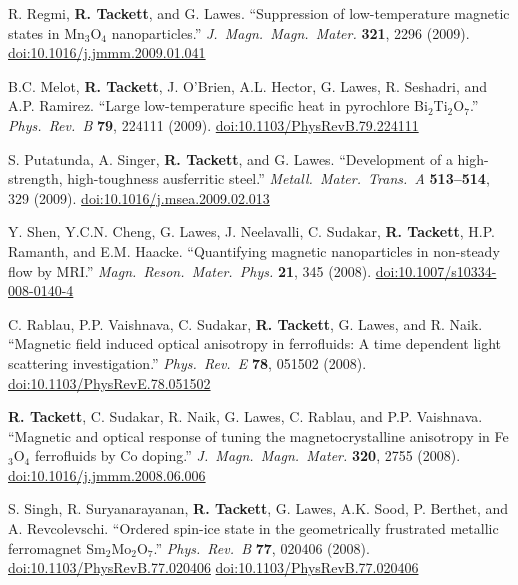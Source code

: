 \documentclass[10pt]{article}
\begin{document}
\begin{reflist}
\item R. Regmi, \textbf{R. Tackett}, and G. Lawes. ``Suppression of low-temperature magnetic states in Mn$_3$O$_4$ nanoparticles.'' \textit{J.\ Magn.\ Magn.\ Mater.} \textbf{321}, 2296 (2009). \href{https://doi.org/10.1016/j.jmmm.2009.01.041}{\small\allowbreak doi:10.1016/j.jmmm.2009.01.041}
\item B.C. Melot, \textbf{R. Tackett}, J. O'Brien, A.L. Hector, G. Lawes, R. Seshadri, and A.P. Ramirez. ``Large low-temperature specific heat in pyrochlore Bi$_2$Ti$_2$O$_7$.'' \textit{Phys.\ Rev.\ B} \textbf{79}, 224111 (2009). \href{https://doi.org/10.1103/PhysRevB.79.224111}{\small\allowbreak doi:10.1103/PhysRevB.79.224111}
\item S. Putatunda, A. Singer, \textbf{R. Tackett}, and G. Lawes. ``Development of a high-strength, high-toughness ausferritic steel.'' \textit{Metall.\ Mater.\ Trans.\ A} \textbf{513--514}, 329 (2009). \href{https://doi.org/10.1016/j.msea.2009.02.013}{\small\allowbreak doi:10.1016/j.msea.2009.02.013}
\item Y. Shen, Y.C.N. Cheng, G. Lawes, J. Neelavalli, C. Sudakar, \textbf{R. Tackett}, H.P. Ramanth, and E.M. Haacke. ``Quantifying magnetic nanoparticles in non-steady flow by MRI.'' \textit{Magn.\ Reson.\ Mater.\ Phys.} \textbf{21}, 345 (2008). \href{https://doi.org/10.1007/s10334-008-0140-4}{\small\allowbreak doi:10.1007/s10334-008-0140-4}
\item C. Rablau, P.P. Vaishnava, C. Sudakar, \textbf{R. Tackett}, G. Lawes, and R. Naik. ``Magnetic field induced optical anisotropy in ferrofluids: A time dependent light scattering investigation.'' \textit{Phys.\ Rev.\ E} \textbf{78}, 051502 (2008). \href{https://doi.org/10.1103/PhysRevE.78.051502}{\small\allowbreak doi:10.1103/PhysRevE.78.051502}
\item \textbf{R. Tackett}, C. Sudakar, R. Naik, G. Lawes, C. Rablau, and P.P. Vaishnava. ``Magnetic and optical response of tuning the magnetocrystalline anisotropy in Fe$_3$O$_4$ ferrofluids by Co doping.'' \textit{J.\ Magn.\ Magn.\ Mater.} \textbf{320}, 2755 (2008). \href{https://doi.org/10.1016/j.jmmm.2008.06.006}{\small\allowbreak doi:10.1016/j.jmmm.2008.06.006}
\item S. Singh, R. Suryanarayanan, \textbf{R. Tackett}, G. Lawes, A.K. Sood, P. Berthet, and A. Revcolevschi. ``Ordered spin-ice state in the geometrically frustrated metallic ferromagnet Sm$_2$Mo$_2$O$_7$.'' \textit{Phys.\ Rev.\ B} \textbf{77}, 020406 (2008). \href{https://doi.org/10.1103/PhysRevB.77.020406}{\small\allowbreak doi:10.1103/PhysRevB.77.020406} \href{https://doi.org/10.1103/PhysRevB.77.020406}{\small\allowbreak doi:10.1103/PhysRevB.77.020406}

\end{reflist}
\end{document}
